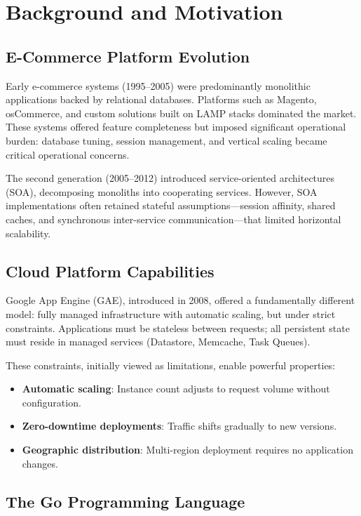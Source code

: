 \section{Background and Motivation}


\subsection{E-Commerce Platform Evolution}

Early e-commerce systems (1995--2005) were predominantly monolithic applications backed by relational databases. Platforms such as Magento, osCommerce, and custom solutions built on LAMP stacks dominated the market. These systems offered feature completeness but imposed significant operational burden: database tuning, session management, and vertical scaling became critical operational concerns.

The second generation (2005--2012) introduced service-oriented architectures (SOA), decomposing monoliths into cooperating services. However, SOA implementations often retained stateful assumptions—session affinity, shared caches, and synchronous inter-service communication—that limited horizontal scalability.

\subsection{Cloud Platform Capabilities}

Google App Engine (GAE), introduced in 2008, offered a fundamentally different model: fully managed infrastructure with automatic scaling, but under strict constraints. Applications must be stateless between requests; all persistent state must reside in managed services (Datastore, Memcache, Task Queues).

These constraints, initially viewed as limitations, enable powerful properties:
\begin{itemize}
\item \textbf{Automatic scaling}: Instance count adjusts to request volume without configuration.
\item \textbf{Zero-downtime deployments}: Traffic shifts gradually to new versions.
\item \textbf{Geographic distribution}: Multi-region deployment requires no application changes.
\end{itemize}

\subsection{The Go Programming Language}

